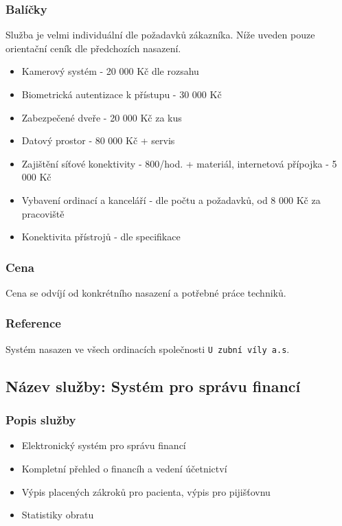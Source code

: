 \documentclass[11pt, a4paper, titlepage]{article}
\begin{document}
	\subsubsection*{Balíčky}
	Služba je velmi individuální dle požadavků zákazníka. Níže uveden pouze orientační ceník dle předchozích nasazení. 

	\begin{itemize}
		\item Kamerový systém - 20 000 Kč dle rozsahu
		\item Biometrická autentizace k přístupu - 30 000 Kč
		\item Zabezpečené dveře - 20 000 Kč za kus
		\item Datový prostor - 80 000 Kč + servis
		\item Zajištění síťové konektivity - 800/hod. + materiál, internetová přípojka - 5 000 Kč
		\item Vybavení ordinací a kanceláří - dle počtu a požadavků, od 8 000 Kč za pracoviště
		\item Konektivita přístrojů - dle specifikace
	\end{itemize}

	\subsubsection*{Cena}
	Cena se odvíjí od konkrétního nasazení a potřebné práce techniků.

	\subsubsection*{Reference}
	Systém nasazen ve všech ordinacích společnosti \texttt{U zubní víly a.s}.

	\subsection*{Název služby: Systém pro správu financí}

	\subsubsection*{Popis služby}
	\begin{itemize}
		\item Elektronický systém pro správu financí
		\item Kompletní přehled o financíh a vedení účetnictví
		\item Výpis placených zákroků pro pacienta, výpis pro pijišťovnu
		\item Statistiky obratu
	\end{itemize}
\end{document}
